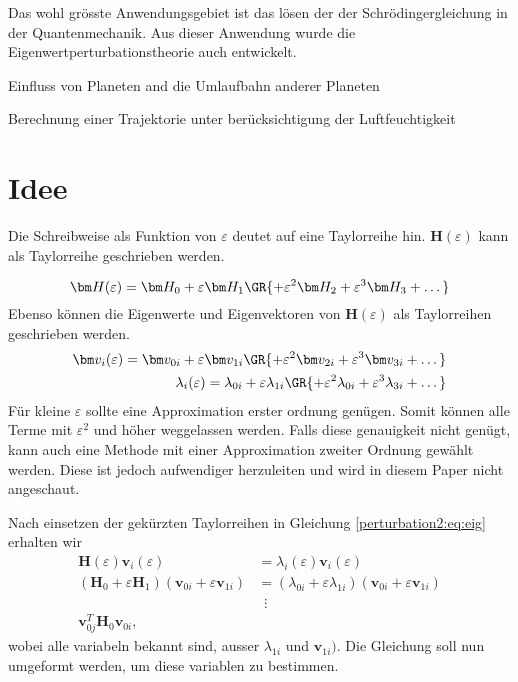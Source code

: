 Das wohl grösste Anwendungsgebiet ist das lösen der der Schrödingergleichung in der Quantenmechanik.
Aus dieser Anwendung wurde die Eigenwertperturbationstheorie auch entwickelt. %
                
Einfluss von Planeten and die Umlaufbahn anderer Planeten

Berechnung einer Trajektorie unter berücksichtigung der Luftfeuchtigkeit %

\section{Idee}

Die Schreibweise als Funktion von $\varepsilon$ deutet auf eine Taylorreihe hin. 
$\bm H(\varepsilon)$ kann als Taylorreihe geschrieben werden.

\begin{equation*}
    \bm H(\varepsilon) = \bm H_0 + \varepsilon \bm H_1 \GR{ + \varepsilon^2 \bm H_2  + \varepsilon^3 \bm H_3 + \dots}
\end{equation*}
Ebenso können die Eigenwerte und Eigenvektoren von $\bm H(\varepsilon)$ als Taylorreihen geschrieben werden.
\begin{align*}
    \bm v_i(\varepsilon) = \bm v_{0i} + \varepsilon \bm v_{1i} \GR{ + \varepsilon^2 \bm v_{2i}  + \varepsilon^3 \bm v_{3i} + \dots} \label{perturbation2:eq:eigvec} \\
    \lambda_i(\varepsilon) = \lambda_{0i} + \varepsilon \lambda_{1i} \GR{ + \varepsilon^2 \lambda_{0i}  + \varepsilon^3 \lambda_{3i} + \dots}  \label{perturbation2:eq:eigval}
\end{align*}
Für kleine $\varepsilon$ sollte eine Approximation erster ordnung genügen.
Somit können alle Terme mit $\varepsilon^2$ und höher weggelassen werden.
Falls diese genauigkeit nicht genügt, kann auch eine Methode mit einer Approximation zweiter Ordnung gewählt werden.
Diese ist jedoch aufwendiger herzuleiten und wird in diesem Paper nicht angeschaut.

Nach einsetzen der gekürzten Taylorreihen in Gleichung \ref{perturbation2:eq:eig} erhalten wir 
\begin{align}
    \bm H(\varepsilon) \bm v_i(\varepsilon)
    &=
    \lambda_i(\varepsilon) \bm v_i(\varepsilon) \\
    (\bm H_0 + \varepsilon \bm H_1)
    (\bm v_{0i} + \varepsilon \bm v_{1i})
    &=
    (\lambda_{0i} + \varepsilon \lambda_{1i})
    (\bm v_{0i} + \varepsilon \bm v_{1i}) \\
    & \phantom{2} \vdots \nonumber\\
    \bm v_{0j}^T \bm H_0 \bm v_{0i},
\end{align}
wobei alle variabeln bekannt sind, ausser $\lambda_{1i}$ und $\bm v_{1i})$.
Die Gleichung soll nun umgeformt werden, um diese variablen zu bestimmen.

